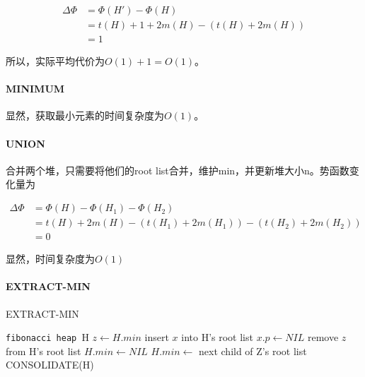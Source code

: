 \documentclass{ctexart}
\newcommand{\fibheap}{\texttt{fibonacci heap }}
\begin{document}
\begin{align*}
    \Delta \Phi &= \Phi(H') - \Phi(H) \\
                & = t(H) + 1 + 2 m(H) - (t(H) + 2m(H)) \\
                & =1
\end{align*}

所以，实际平均代价为$O(1) +  1 = O(1)$。

\paragraph{MINIMUM}

显然，获取最小元素的时间复杂度为$O(1)$。

\paragraph{UNION}

合并两个堆，只需要将他们的root list合并，维护min，并更新堆大小n。势函数变化量为

\begin{align*}
    \Delta \Phi &= \Phi(H) - \Phi(H_1) - \Phi(H_2) \\
                & = t(H) + 2 m(H) - (t(H_1) + 2m(H_1))  - (t(H_2) + 2m(H_2))\\
                & =0
\end{align*}

显然，时间复杂度为$O(1)$

\paragraph{EXTRACT-MIN}
\begin{algorithm}
    \caption{EXTRACT-MIN}
    \begin{algorithmic}[1]
        \Require \fibheap H
        \State $z \gets H.min$
                \State insert $x$ into H's root list
                \State $x.p \gets NIL$
            \EndFor
            \State remove $z$ from H's root list
                \State $H.min \gets NIL$ 
            \Else
                \State $H.min \gets $ next child of Z's root list 
                \State CONSOLIDATE(H) 
            \EndIf
        \EndIf
    \end{algorithmic}
\end{algorithm}
\end{document}
